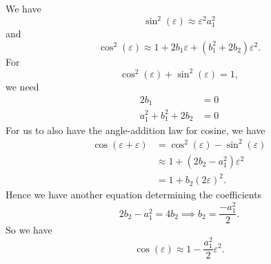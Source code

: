 We have
\begin{equation}
\sin^{2}(\varepsilon)\approx \varepsilon^{2}a_{1}^{2}
\end{equation}
and
\begin{equation}
\cos^{2}(\varepsilon) \approx 1 + 2b_{1}\varepsilon + (b_{1}^{2} + 2 b_{2})\varepsilon^{2}.
\end{equation}
For
\begin{equation}
\cos^{2}(\varepsilon) + \sin^{2}(\varepsilon) = 1,
\end{equation}
we need
\begin{subequations}
\begin{align}
2b_{1} &= 0\\
a_{1}^{2} + b_{1}^{2} + 2b_{2} &= 0
\end{align}
\end{subequations}
For us to also have the angle-addition law for cosine, we have
\begin{equation}
\begin{split}
\cos(\varepsilon+\varepsilon)&=\cos^{2}(\varepsilon) - \sin^{2}(\varepsilon)\\
&\approx 1 + (2b_{2}-a_{1}^{2})\varepsilon^{2}\\
&=1 + b_{2}(2\varepsilon)^{2}.
\end{split}
\end{equation}
Hence we have another equation determining the coefficients
\begin{equation}
2b_{2} - a_{1}^{2} = 4b_{2}\implies b_{2} = \frac{-a_{1}^{2}}{2}.
\end{equation}
So we have
\begin{equation}
\cos(\varepsilon)\approx 1 - \frac{a_{1}^{2}}{2}\varepsilon^{2}.
\end{equation}

